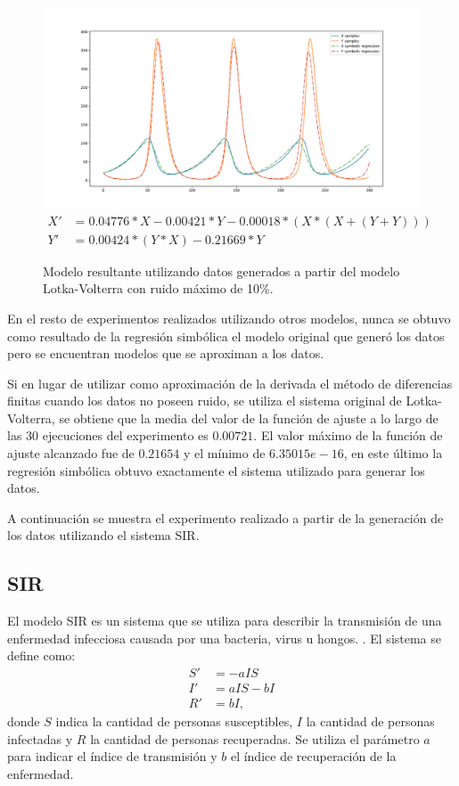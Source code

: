 \begin{figure}[h]
    \centering
    \includegraphics[width=\textwidth]{"figures/final_plot_LV_0.1.pdf"}
    \begin{align*}
        X' & = 0.04776 * X -0.00421 * Y -0.00018 * (X * (X + (Y + Y))) \\
        Y' & = 0.00424 * (Y * X) -0.21669 * Y
    \end{align*}
    \caption{Modelo resultante utilizando datos generados a partir del modelo Lotka-Volterra con ruido máximo de 10\%.}
    \label{fig:final_plot_LV_0.1}
\end{figure}


En el resto de experimentos realizados utilizando otros modelos, nunca se obtuvo como resultado de la regresión simbólica el modelo original que generó los datos pero se encuentran modelos que se aproximan a los datos.

Si en lugar de utilizar como aproximación de la derivada el método de diferencias finitas cuando los datos no poseen ruido, se utiliza el sistema original de Lotka-Volterra, se obtiene que la media del valor de la función de ajuste a lo largo de las 30 ejecuciones del experimento es $0.00721$. El valor máximo de la función de ajuste alcanzado fue de $0.21654$ y el mínimo de $6.35015e-16$, en este último la regresión simbólica obtuvo exactamente el sistema utilizado para generar los datos.


A continuación se muestra el experimento realizado a partir de la generación de los datos utilizando el sistema SIR.

\subsection{SIR}

El modelo SIR es un sistema que se utiliza para describir la transmisión de una enfermedad infecciosa causada por una bacteria, virus u hongos. \cite{weiss2013sir}. El sistema se define como:
\begin{align*}
    S' & = - aIS    \\
    I' & = aIS - bI \\
    R' & = bI,
\end{align*}
donde $S$ indica la cantidad de personas susceptibles, $I$ la cantidad de personas infectadas y $R$ la cantidad de personas recuperadas. Se utiliza el parámetro $a$ para indicar el índice de transmisión y $b$ el índice de recuperación de la enfermedad.

